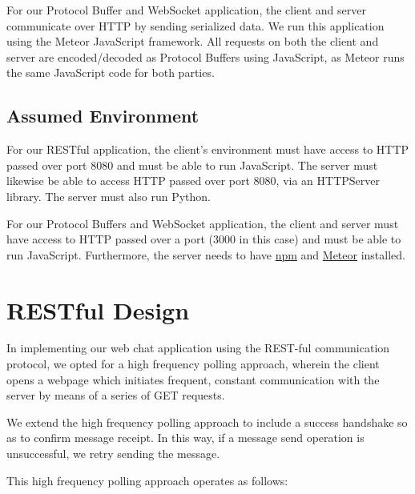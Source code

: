 \documentclass[11pt]{article} %
\begin{document}
For our Protocol Buffer and WebSocket application, the client and server communicate over HTTP by sending serialized data. We run this application using the Meteor JavaScript framework. All requests on both the client and server are encoded/decoded as Protocol Buffers using JavaScript, as Meteor runs the same JavaScript code for both parties. 

\subsection{Assumed Environment}

For our RESTful application, the client's environment must have access to HTTP passed over port 8080 and must be able to run JavaScript. The server must likewise be able to access HTTP passed over port 8080, via an HTTPServer library. The server must also run Python.

For our Protocol Buffers and WebSocket application, the client and server must have access to HTTP passed over a port (3000 in this case) and must be able to run JavaScript. Furthermore, the server needs to have \href{https://www.npmjs.com/}{npm} and \href{https://www.meteor.com/}{Meteor} installed.

\section{RESTful Design}


 In implementing our web chat application using the REST-ful communication protocol, we opted for a high frequency polling approach, wherein the client opens a webpage which initiates frequent, constant communication with the server by means of a series of GET requests. 
 
We extend the high frequency polling approach to include a success handshake so as to confirm message receipt. In this way, if a message send operation is unsuccessful, we retry sending the message.


 This high frequency polling approach operates as follows: 
\end{document}

